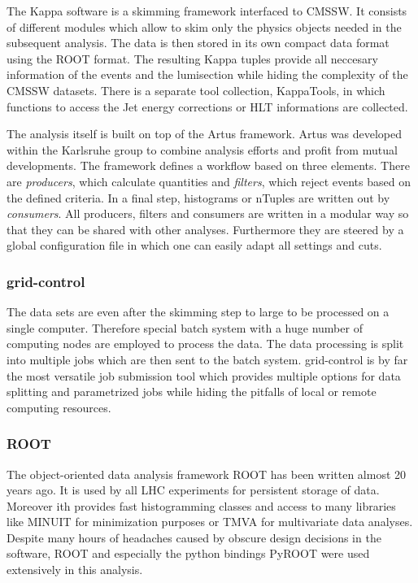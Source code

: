 The Kappa software is a skimming framework interfaced to CMSSW. It consists of
different modules which allow to skim only the physics objects needed in the
subsequent analysis. The data is then stored in its own compact data format
using the ROOT format. The resulting Kappa tuples provide all neccesary
information of the events and the lumisection while hiding the complexity of the
CMSSW datasets. There is a separate tool collection, KappaTools, in which
functions to access the Jet energy corrections or HLT informations are
collected.

The analysis itself is built on top of the Artus framework. Artus was developed
within the Karlsruhe group to combine analysis efforts and profit from mutual
developments. The framework defines a workflow based on three elements. There
are \emph{producers}, which calculate quantities and \emph{filters}, which reject events based on
the defined criteria. In a final step, histograms or nTuples are written out by
\emph{consumers}. All producers, filters and consumers are written in a modular
way so that they can be shared with other analyses. Furthermore they are steered
by a global configuration file in which one can easily adapt all settings and
cuts.

\subsubsection{grid-control}

The data sets are even after the skimming step to large to be processed on a
single computer. Therefore special batch system with a huge number of computing
nodes are employed to process the data. The data processing is split into
multiple jobs which are then sent to the batch system. grid-control is by far
the most versatile job submission tool which provides multiple options for data
splitting and parametrized jobs while hiding the pitfalls of local or remote
computing resources.

\subsubsection{ROOT}

The object-oriented data analysis framework ROOT has been written almost 20 years
ago. It is used by all LHC experiments for persistent storage of data. Moreover
ith provides fast histogramming classes and access to many libraries like MINUIT
for minimization purposes or TMVA for multivariate data analyses. Despite
many hours of headaches caused by obscure design decisions in the software, ROOT
and especially the python bindings PyROOT were used extensively in this analysis.

